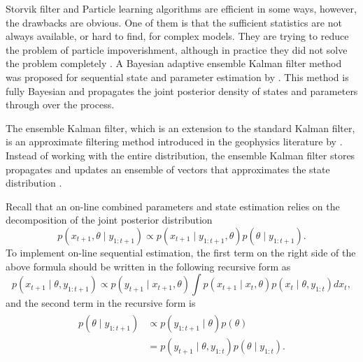 Storvik filter and Particle learning algorithms are efficient in some ways,  however, the drawbacks are obvious. One of them is that the sufficient statistics are not always available, or hard to find, for complex models. They are trying to reduce the problem of particle impoverishment, although in practice they did not solve the problem completely \citep{chopin2010particle}. A Bayesian adaptive ensemble Kalman filter method was proposed for sequential state and parameter estimation by \cite{stroud2018bayesian}. This method is fully Bayesian and propagates the joint posterior density of states and parameters through over the process. 


The ensemble Kalman filter, which is an extension to the standard Kalman filter, is an approximate filtering method introduced in the geophysics literature by \cite{evensen1994sequential}. Instead of working with the entire distribution, the ensemble Kalman filter stores propagates and updates an ensemble of vectors that approximates the state distribution \citep{katzfuss2016understanding}. 


Recall that an on-line combined parameters and state estimation relies on the decomposition of the joint posterior distribution 
\begin{equation}\label{jointposterior}
p(x_{t+1},\theta \mid y_{1:t+1}) \propto p(x_{t+1}\mid y_{1:t+1},\theta)p(\theta\mid y_{1:t+1}).
\end{equation}
To implement on-line sequential estimation, the first term on the right side of the above formula should be written in the following recursive form as 
\begin{equation}\label{jointposteriorterm1}
p(x_{t+1}\mid \theta, y_{1:t+1}) \propto p(y_{t+1}\mid x_{t+1},\theta) \int p(x_{t+1}\mid x_{t},\theta) p(x_{t}\mid \theta, y_{1:t})dx_{t},
\end{equation}
and the second term in the recursive form is 
\begin{align}\label{jointposteriorterm2}
\begin{split}
p(\theta\mid y_{1:t+1}) & \propto p( y_{1:t+1}\mid\theta)p(\theta) \\
&= p(y_{t+1}\mid\theta,y_{1:t})p(\theta\mid y_{1:t}).
\end{split}
\end{align}



